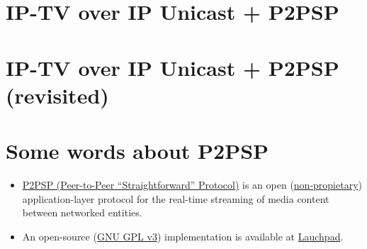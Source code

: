 \documentclass{article}
\begin{document}
\section{IP-TV over IP Unicast + P2PSP}
\ifx \HCode\Undfef
\else
{}
\fi

\section{IP-TV over IP Unicast + P2PSP (revisited)}
\ifx \HCode\Undfef
\else
{}
\fi

\section{Some words about P2PSP}
\begin{itemize}

\item \href{http://www.p2psp.org/en/}{P2PSP (Peer-to-Peer ``Straightforward'' Protocol)} is an open
  (\href{http://www.oxforddictionaries.com/definition/english/non-proprietary}{non-propietary})
  application-layer protocol for the real-time streaming of media
  content between networked entities.
\item An open-source (\href{https://www.gnu.org/copyleft/gpl.html}{GNU
    GPL v3}) implementation is available at
  \href{https://launchpad.net/p2psp}{Lauchpad}.
\end{itemize}

\end{document}
